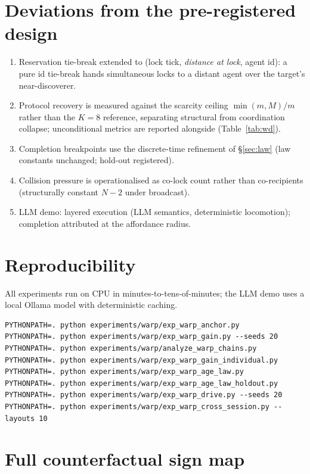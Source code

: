 \documentclass{article}
\begin{document}
\section{Deviations from the pre-registered design}
\label{app:deviations}
\begin{enumerate}[leftmargin=20pt,itemsep=2pt,topsep=2pt]
\item Reservation tie-break extended to (lock tick, \emph{distance at
  lock}, agent id): a pure id tie-break hands simultaneous locks to a
  distant agent over the target's near-discoverer.
\item Protocol recovery is measured against the scarcity ceiling
  $\min(m,M)/m$ rather than the $K{=}8$ reference, separating
  structural from coordination collapse; unconditional metrics are
  reported alongside (Table~\ref{tab:wd}).
\item Completion breakpoints use the discrete-time refinement of
  \S\ref{sec:law} (law constants unchanged; hold-out registered).
\item Collision pressure is operationalised as co-lock count rather
  than co-recipients (structurally constant $N{-}2$ under broadcast).
\item LLM demo: layered execution (LLM semantics, deterministic
  locomotion); completion attributed at the affordance radius.
\end{enumerate}

\section{Reproducibility}
\label{app:repro}
All experiments run on CPU in minutes-to-tens-of-minutes; the LLM demo
uses a local Ollama model with deterministic caching.
\begin{verbatim}
PYTHONPATH=. python experiments/warp/exp_warp_anchor.py
PYTHONPATH=. python experiments/warp/exp_warp_gain.py --seeds 20
PYTHONPATH=. python experiments/warp/analyze_warp_chains.py
PYTHONPATH=. python experiments/warp/exp_warp_gain_individual.py
PYTHONPATH=. python experiments/warp/exp_warp_age_law.py
PYTHONPATH=. python experiments/warp/exp_warp_age_law_holdout.py
PYTHONPATH=. python experiments/warp/exp_warp_drive.py --seeds 20
PYTHONPATH=. python experiments/warp/exp_warp_cross_session.py --layouts 10
\end{verbatim}

\section{Full counterfactual sign map}
\label{app:signmap}
\end{document}
